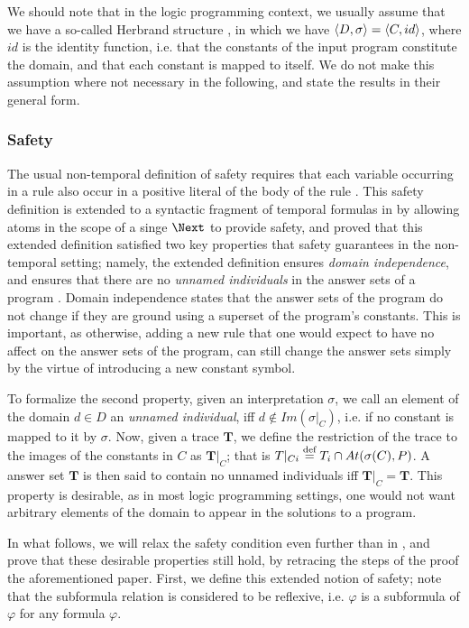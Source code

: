 We should note that in the logic programming context, we usually
assume that we have a so-called Herbrand structure \cite{peaval06a},
in which we have $\langle D, \sigma \rangle = \langle C, id \rangle$, where $id$ is the
identity function, i.e. that the constants of the input program
constitute the domain, and that each constant is mapped to itself. We
do not make this assumption where not necessary in the following, and
state the results in their general form.

\subsubsection{Safety}

The usual non-temporal definition of safety requires that each
variable occurring in a rule also occur in a positive literal of the
body of the rule \cite{gekakasc12a}. This safety definition is
extended to a syntactic fragment of temporal formulas in
\cite{agcapevidi17a} by allowing atoms in the scope of a singe $\Next$
to provide safety, and proved that this extended definition satisfied
two key properties that safety guarantees in the non-temporal setting;
namely, the extended definition ensures \emph{domain independence},
and ensures that there are no \emph{unnamed individuals} in the answer
sets of a program \cite{capeva09a} \cite{capeva09b}. Domain
independence states that the answer sets of the program do not change
if they are ground using a superset of the program's constants. This
is important, as otherwise, adding a new rule that one would expect to
have no affect on the answer sets of the program, can still change the
answer sets simply by the virtue of introducing a new constant symbol.

To formalize the second property, given an interpretation $\sigma$, we
call an element of the domain $d \in D$ an \emph{unnamed individual},
iff $d \not\in Im(\sigma\vert_{C})$, i.e. if no constant is mapped to
it by $\sigma$. Now, given a trace $\bm{T}$, we define the restriction
of the trace to the images of the constants in $C$ as
$\bm{T}\vert _C$; that is
$T\vert_{Ci} \stackrel{\text{def}}{=} T_i \cap At(\sigma(C),P)$. A answer set $\bm{T}$
is then said to contain no unnamed individuals iff
$\bm{T} \vert_{C} = \bm{T}$. This property is desirable, as in most
logic programming settings, one would not want arbitrary elements of
the domain to appear in the solutions to a program.

In what follows, we will relax the safety condition even further than
in \cite{agcapevidi17a}, and prove that these desirable properties
still hold, by retracing the steps of the proof the aforementioned
paper. First, we define this extended notion of safety; note that the
subformula relation is considered to be reflexive, i.e. $\varphi$ is a
subformula of $\varphi$ for any formula $\varphi$.

